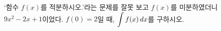 ‘함수 $f(x)$를 적분하시오.’라는 문제를 잘못 보고 $f(x)$를 미분하였더니 $9x^2-2x+1$이었다. $f(0)=2$일 때, $\displaystyle\int f(x)\mkern3mu dx$를 구하시오.

